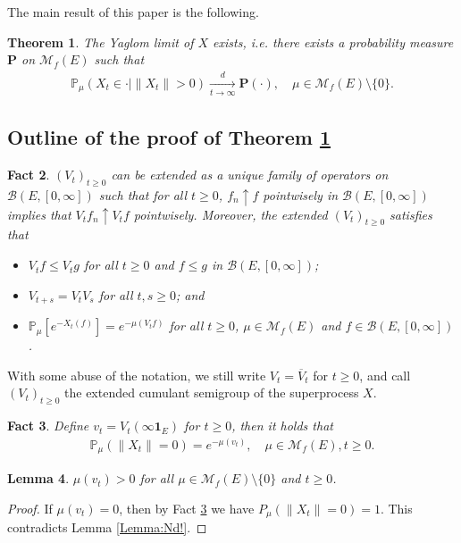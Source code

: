 \documentclass[12pt,a4paper]{amsart}
\numberwithin{equation}{section}
\theoremstyle{plain}
\newtheorem{thm}{Theorem}[section]
\newtheorem{lem}[thm]{Lemma}
\newtheorem{fact}[thm]{Fact}
\theoremstyle{definition}
\theoremstyle{remark}
\newcounter{N}
\newcounter{n}[N]
\begin{document}
	The main result of this paper is the following.
\begin{thm} \label{Theorem:Y:H1:H2:H3:H4} 
	The Yaglom limit of $X$ exists, i.e. there exists a probability measure $\mathbf P$ on $\mathcal M_f(E)$ such that 
\begin{align}
 	\mathbb P_\mu (X_t \in \cdot | \|X_t\|> 0 ) 
 	\xrightarrow[t\to \infty]{d} \mathbf P(\cdot), 
 	\quad \mu \in \mathcal M_f(E)\setminus \{0\}.
\end{align}
\end{thm}
\subsection{Outline of the proof of Theorem \ref{Theorem:Y:H1:H2:H3:H4}}
	\label{subsec:OY}
\begin{fact} \label{Fact:BV!} 
	$(V_t)_{t\geq 0}$ can be extended as a unique family of operators on $\mathcal B(E,[0,\infty])$ such that for all $t\geq 0$, $f_n \uparrow f$ pointwisely in  $\mathcal B(E, [0,\infty])$ implies that $V_tf_n \uparrow V_tf$ pointwisely.
Moreover, the extended $(V_t)_{t\geq 0}$ satisfies that 
\begin{itemize}
\item
$V_t f \leq V_t g$ for all $t\geq 0$ and $f\leq g$ in $\mathcal B(E,[0,\infty])$; 
\item 
$V_{t+s} = V_t V_s$ for all $t, s\geq 0$;  and
\item 
$\mathbb P_\mu [e^{-X_t(f)}] = e^{- \mu(V_tf)}$ for all $t\geq 0$, $\mu \in \mathcal M_f(E)$ and $f\in \mathcal B(E,[0,\infty])$.
\end{itemize}
\end{fact}
With some abuse of the notation, we still write $V_t = \overline V_t$ for $t\geq 0$, and call $(V_t)_{t\geq 0}$ the extended cumulant semigroup of the superprocess $X$.
\begin{fact} \label{Fact:sv1!} 
Define $v_t = V_t(\infty\mathbf 1_E)$ for $t\geq 0$, then it holds that 
\begin{align}
\mathbb P_\mu (\|X_t\| = 0) 
= e^{- \mu (v_t)}, 
\quad \mu \in \mathcal M_f(E), t\geq 0.
\end{align}
\end{fact}
\begin{lem} \label{Lemma:sv2!} 
$\mu(v_t) > 0$ for all $\mu \in \mathcal M_f(E)\setminus\{0\}$ and $t \geq 0$.
\end{lem}

\begin{proof} 
	If $\mu(v_t) = 0$, then by Fact \ref{Fact:sv1!} we have $P_\mu(\|X_t \| = 0) = 1$.
	This contradicts Lemma \ref{Lemma:Nd!}.
\end{proof}
\end{document}
